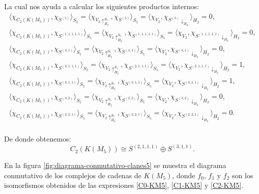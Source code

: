 \documentclass[12pt]{book}
\theoremstyle{definition}
\newcounter{in}
\begin{document}
La cual nos ayuda a calcular los siguientes productos internos:
\begin{eqnarray*}
  \langle\chi_{C_{2}(K(M_{5}))},\chi_{S^{(5)}}\rangle_{S_{5}}=\langle\chi_{V_{2}\uparrow^{S_{5}}_{H_{2}}},\chi_{S^{(5)}}\rangle_{S_{5}}=\langle\chi_{V_{2}},\chi_{S^{(5)}\downarrow_{H_{2}}}\rangle_{H_{2}}=0,\\
  \langle\chi_{C_{2}(K(M_{5}))},\chi_{S^{(1,1,1,1,1)}}\rangle_{S_{5}}=\langle\chi_{V_{2}\uparrow^{S_{5}}_{H_{2}}},\chi_{S^{(1,1,1,1,1)}}\rangle_{S_{5}}=\langle\chi_{V_{2}},\chi_{S^{(1,1,1,1,1)}\downarrow_{H_{2}}}\rangle_{H_{2}}=0,\\
  \langle\chi_{C_{2}(K(M_{5}))},\chi_{S^{(4,1)}}\rangle_{S_{5}}=\langle\chi_{V_{2}\uparrow^{S_{5}}_{H_{2}}},\chi_{S^{(4,1)}}\rangle_{S_{5}}=\langle\chi_{V_{2}},\chi_{S^{(4,1)}\downarrow_{H_{2}}}\rangle_{H_{2}}=0,\\
  \langle\chi_{C_{2}(K(M_{5}))},\chi_{S^{(2,1,1,1)}}\rangle_{S_{5}}=\langle\chi_{V_{2}\uparrow^{S_{5}}_{H_{2}}},\chi_{S^{(2,1,1,1)}}\rangle_{S_{5}}=\langle\chi_{V_{2}},\chi_{S^{(2,1,1,1)}\downarrow_{H_{2}}}\rangle_{H_{2}}=1,\\
  \langle\chi_{C_{2}(K(M_{5}))},\chi_{S^{(3,1,1)}}\rangle_{S_{5}}=\langle\chi_{V_{2}\uparrow^{S_{5}}_{H_{2}}},\chi_{S^{(3,1,1)}}\rangle_{S_{5}}=\langle\chi_{V_{2}},\chi_{S^{(3,1,1)}\downarrow_{H_{2}}}\rangle_{H_{2}}=1,\\
  \langle\chi_{C_{2}(K(M_{5}))},\chi_{S^{(3,2)}}\rangle_{S_{5}}=\langle\chi_{V_{2}\uparrow^{S_{5}}_{H_{2}}},\chi_{S^{(3,2)}}\rangle_{S_{5}}=\langle\chi_{V_{2}},\chi_{S^{(3,2)}\downarrow_{H_{2}}}\rangle_{H_{2}}=0,\\
  \langle\chi_{C_{2}(K(M_{5}))},\chi_{S^{(2,2,1)}}\rangle_{S_{5}}=\langle\chi_{V_{2}\uparrow^{S_{5}}_{H_{2}}},\chi_{S^{(2,2,1)}}\rangle_{S_{5}}=\langle\chi_{V_{2}},\chi_{S^{(2,2,1)}\downarrow_{H_{2}}}\rangle_{H_{2}}=0.\\
\end{eqnarray*}

De donde obtenemos:
\begin{equation}
  \label{C2-KM5}
  C_{2}(K(M_{5}))\cong S^{(2,1,1,1)}\oplus S^{(3,1,1)}.
\end{equation}

En la figura \ref{fig:diagrama-conmutativo-clanes5} se muestra el diagrama
conmutativo de los complejos de cadenas de $K(M_{5})$, donde $f_{0}$,
$f_{1}$ y $f_{2}$ son los isomorfismos obtenidos de las expresiones
\ref{C0-KM5}, \ref{C1-KM5} y \ref{C2-KM5}.
\end{document}
